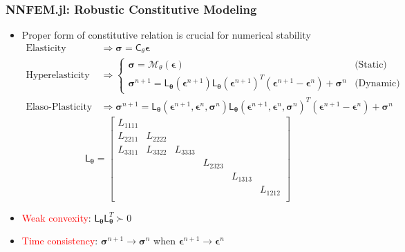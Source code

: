 \documentclass{beamer}
\newcommand{\ChoL}{\mathsf{L}}
\newcommand{\bt}[0]{\bm{\theta}}
\begin{document}
\begin{frame}
	\frametitle{NNFEM.jl: Robustic Constitutive Modeling}
	\begin{itemize}
\item Proper form of constitutive relation is crucial for numerical stability
{\footnotesize\begin{align*}
 \mbox{Elasticity} &\Rightarrow \bm\sigma = \mathsf{C}_{\theta}\bm\epsilon \\
\mbox{Hyperelasticity } &\Rightarrow \begin{cases}\bm\sigma =\mathcal{M}_{\theta}(\bm\epsilon) & \mbox{(Static)} \\
\bm{\sigma}^{n+1}  =  \ChoL_{\bt}(\bm\epsilon^{n+1}) \ChoL_{\bt}(\bm\epsilon^{n+1})^T (\bm{\epsilon}^{n+1} - \bm{\epsilon}^{n})  + \bm{\sigma}^{n}  & \mbox{(Dynamic)} \end{cases} \\
	\mbox{Elaso-Plasticity} &\Rightarrow \bm\sigma^{n+1} = \ChoL_{\bt}(\bm\epsilon^{n+1},\bm{\epsilon}^{n},\bm{\sigma}^{n}) \ChoL_{\bt}(\bm\epsilon^{n+1},\bm{\epsilon}^{n},\bm{\sigma}^{n})^T (\bm{\epsilon}^{n+1} - \bm{\epsilon}^{n})  + \bm{\sigma}^{n} 
\end{align*}
}{\footnotesize$$\ChoL_{\bt} = \begin{bmatrix}
L_{1111}  &  & &  &       &\\
L_{2211}  & L_{2222} & &   & &\\
 L_{3311}  &  L_{3322}               & L_{3333} &  & &\\
               &                 &                 & L_{2323}&  &\\
              &               &                  &                & L_{1313} &\\
              &                 &                  &                &                 &L_{1212}\\
\end{bmatrix}$$}
	\item \textcolor{red}{Weak convexity}: $\ChoL_{\bt}\ChoL_{\bt}^T \succ 0$
	\item \textcolor{red}{Time consistency}:  $\bm\sigma^{n+1} \rightarrow \bm \sigma^n$ when $\bm\epsilon^{n+1} \rightarrow \bm \epsilon^n$
\end{itemize}

\end{frame}
\end{document}
